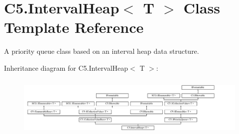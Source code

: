 \hypertarget{class_c5_1_1_interval_heap}{}\section{C5.\+Interval\+Heap$<$ T $>$ Class Template Reference}
\label{class_c5_1_1_interval_heap}


A priority queue class based on an interval heap data structure.  


Inheritance diagram for C5.\+Interval\+Heap$<$ T $>$\+:\begin{figure}[H]
\begin{center}
\leavevmode
\includegraphics[height=2.947368cm]{class_c5_1_1_interval_heap}
\end{center}
\end{figure}
